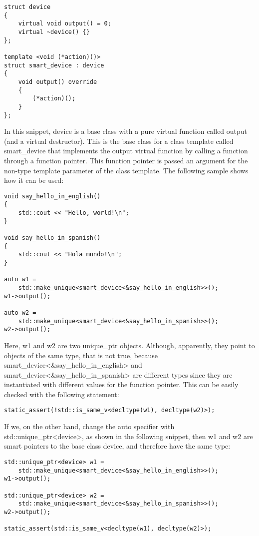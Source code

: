 \begin{lstlisting}[style=styleCXX]
struct device
{
	virtual void output() = 0;
	virtual ~device() {}
};

template <void (*action)()>
struct smart_device : device
{
	void output() override
	{
		(*action)();
	}
};
\end{lstlisting}

In this snippet, device is a base class with a pure virtual function called output (and a virtual destructor). This is the base class for a class template called smart\_device that implements the output virtual function by calling a function through a function pointer. This function pointer is passed an argument for the non-type template parameter of the class template. The following sample shows how it can be used:

\begin{lstlisting}[style=styleCXX]
void say_hello_in_english()
{
	std::cout << "Hello, world!\n";
}

void say_hello_in_spanish()
{
	std::cout << "Hola mundo!\n";
}

auto w1 =
	std::make_unique<smart_device<&say_hello_in_english>>();
w1->output();

auto w2 =
	std::make_unique<smart_device<&say_hello_in_spanish>>();
w2->output();
\end{lstlisting}

Here, w1 and w2 are two unique\_ptr objects. Although, apparently, they point to objects of the same type, that is not true, because smart\_device<\&say\_hello\_in\_english> and smart\_device<\&say\_hello\_in\_spanish> are different types since they are instantiated with different values for the function pointer. This can be easily checked with the following statement:

\begin{lstlisting}[style=styleCXX]
static_assert(!std::is_same_v<decltype(w1), decltype(w2)>);
\end{lstlisting}

If we, on the other hand, change the auto specifier with std::unique\_ptr<device>, as shown in the following snippet, then w1 and w2 are smart pointers to the base class device, and therefore have the same type:

\begin{lstlisting}[style=styleCXX]
std::unique_ptr<device> w1 =
	std::make_unique<smart_device<&say_hello_in_english>>();
w1->output();

std::unique_ptr<device> w2 =
	std::make_unique<smart_device<&say_hello_in_spanish>>();
w2->output();

static_assert(std::is_same_v<decltype(w1), decltype(w2)>);
\end{lstlisting}

